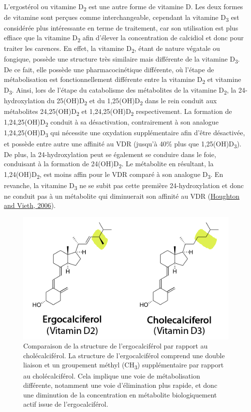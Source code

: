 \documentclass[
  a4paper,
  DIV=11,
  numbers=noendperiod,
  listof=totoc]{scrreprt}
\begin{document}
L'ergostérol ou vitamine D\textsubscript{2} est une autre forme de
vitamine D. Les deux formes de vitamine sont perçues comme
interchangeable, cependant la vitamine D\textsubscript{3} est considérée
plus intéressante en terme de traitement, car son utilisation est plus
effiace que la vitamine D\textsubscript{2} afin d'élever la
concentration de calcidiol et donc pour traiter les carences. En effet,
la vitamine D\textsubscript{2}, étant de nature végatale ou fongique,
possède une structure très similaire mais différente de la vitamine
D\textsubscript{3}. De ce fait, elle possède une pharmacocinétique
différente, où l'étape de métabolisation est fonctionnellement
différente entre la vitamine D\textsubscript{2} et vitamine
D\textsubscript{3}. Ainsi, lors de l'étape du catabolisme des
métabolites de la vitamine D\textsubscript{2}, la 24-hydroxylation du
25(OH)D\textsubscript{2} et du 1,25(OH)D\textsubscript{2} dans le rein
conduit aux métabolites 24,25(OH)D\textsubscript{2} et
1,24,25(OH)D\textsubscript{2} respectivement. La formation de
1,24,25(OH)D\textsubscript{2} conduit à sa désactivation, contrairement
à son analogue 1,24,25(OH)D\textsubscript{3} qui nécessite une oxydation
supplémentaire afin d'être désactivée, et possède entre autre une
affinité au VDR (jusqu'à 40\% plus que 1,25(OH)D\textsubscript{3}). De
plus, la 24-hydroxylation peut se également se conduire dans le foie,
conduisant à la formation de 24(OH)D\textsubscript{2}. Le métabolite en
résultant, la 1,24(OH)D\textsubscript{2}, est moins affin pour le VDR
comparé à son analogue D\textsubscript{3}. En revanche, la vitamine
D\textsubscript{3} ne se subit pas cette première 24-hydroxylation et
donc ne conduit pas à un métabolite qui diminuerait son affinité au VDR
(\protect\hyperlink{ref-Houghton.2006}{Houghton and Vieth, 2006}).

\begin{figure}
\includegraphics{figures/ergo_vs_chole.png} 
\caption[\textbf{Comparaison de la structure de l'ergocalciférol par rapport au cholécalciférol.}]{Comparaison de la structure de l'ergocalciférol par rapport au cholécalciférol. La structure de l'ergocalciférol comprend une double liaison et un groupement méthyl (CH\textsubscript{3}) supplémentaire par rapport au cholécalciférol. Cela implique une voie de métabolisation différente, notamment une voie d'élimination plus rapide, et donc une diminution de la concentration en métabolite biologiquement actif issue de l'ergocalciférol. \cite{Houghton.2006}}
\label{fig:ergo-struc}
\end{figure}
\end{document}
